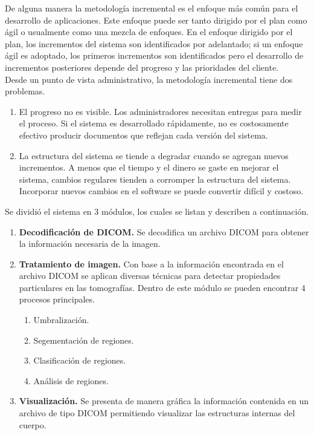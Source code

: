 \documentclass[12pt]{report}
\begin{document}
De alguna manera la metodología incremental es el enfoque más común para el desarrollo de aplicaciones. Este enfoque puede ser tanto dirigido por el plan como ágil o usualmente como una mezcla de enfoques. En el enfoque dirigido por el plan, los incrementos del sistema son identificados por adelantado; si un enfoque ágil es adoptado, los primeros incrementos son identificados pero el desarrollo de incrementos posteriores depende del progreso y las prioridades del cliente.\cite{meto}\\
Desde un punto de vista administrativo, la metodología incremental tiene dos problemas.

\begin{enumerate}
\item El progreso no es visible. Los administradores necesitan entregas para medir el proceso. Si el sistema es desarrollado rápidamente, no es costosamente efectivo producir documentos que reflejan cada versión del sistema.
\item La estructura del sistema se tiende a degradar cuando se agregan nuevos incrementos. A menos que el tiempo y el dinero se gaste en mejorar el sistema, cambios regulares tienden a corromper la estructura del sistema. Incorporar nuevos cambios en el software se puede convertir difícil y costoso.
\end{enumerate}

Se dividió el sistema en 3 módulos, los cuales se listan y describen a continuación.

\begin{enumerate}[{Módulo} 1.]
\item \textbf{Decodificación de DICOM.} Se decodifica  un archivo DICOM para obtener la información necesaria de la imagen.
\item \textbf{Tratamiento de imagen.} Con base a la información encontrada en el archivo DICOM se aplican diversas técnicas para detectar propiedades particulares en las tomografías. Dentro de este módulo se pueden encontrar 4 procesos principales.
\begin{enumerate}
\item Umbralización.
\item Segementación de regiones.
\item Clasificación de regiones.
\item Análisis de regiones.
\end{enumerate}
\item \textbf{Visualización.} Se presenta de manera gráfica la información contenida en un archivo de tipo DICOM permitiendo visualizar las estructuras internas del cuerpo.
\end{enumerate}
\end{document}
